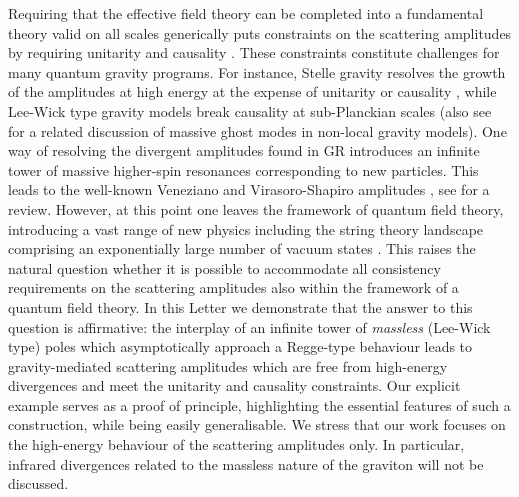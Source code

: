 \documentclass[aps,prl,onecolumn,superscriptaddress,longbibliography,nofootinbib,floatfix,showpacs,12pt]{revtex4-1}
\newcommand{\GR}{{\small GR}}
\begin{document}
Requiring that the effective field theory can be completed into a fundamental theory valid on all scales generically puts constraints on the scattering amplitudes by requiring unitarity and causality \cite{Adams:2006sv, Camanho:2014apa, Bellazzini:2015cra, Chandrasekaran:2018qmx}.
These constraints constitute challenges for many quantum gravity programs.
For instance, Stelle gravity \cite{Stelle:1976gc, Stelle:1977ry} resolves the growth of the amplitudes at high energy at the expense of unitarity or causality \cite{Anselmi:2019nie, Donoghue:2019ecz}, while Lee-Wick type gravity models \cite{Tomboulis:1977jk, Tomboulis:1980bs,Anselmi:2018kgz, Anselmi:2018tmf, Anselmi:2018bra, Anselmi:2020tqo} break causality at sub-Planckian scales (also see \cite{Shapiro:2015uxa,Salles:2018ccb} for a related discussion of massive ghost modes in non-local gravity models).
One way of resolving the divergent amplitudes found in \GR{} introduces an infinite tower of massive higher-spin resonances corresponding to new particles.
This leads to the well-known Veneziano and Virasoro-Shapiro amplitudes \cite{Veneziano:1968yb, Virasoro:1969me, Shapiro:1970gy,Alonso:2019ptb}, see \cite{Green:1987sp} for a review.
However, at this point one leaves the framework of quantum field theory, introducing a vast range of 
new physics including the string theory landscape comprising an exponentially large number of vacuum states \cite{Douglas:2003um, Taylor:2015xtz}.
This raises the natural question whether it is possible to accommodate all consistency requirements on the scattering amplitudes also within the framework of a  quantum field theory.
In this Letter we demonstrate that the answer to this question is affirmative: the interplay of an infinite tower of \emph{massless} (Lee-Wick type) poles which asymptotically approach a Regge-type behaviour leads to gravity-mediated scattering amplitudes which are free from high-energy divergences and meet the unitarity and causality constraints.
Our explicit example serves as a proof of principle, highlighting the essential features of such a construction, while being easily generalisable.
We stress that our work focuses on the high-energy behaviour of the scattering amplitudes only.
In particular, infrared divergences related to the massless nature of the graviton will not be discussed.
\end{document}
